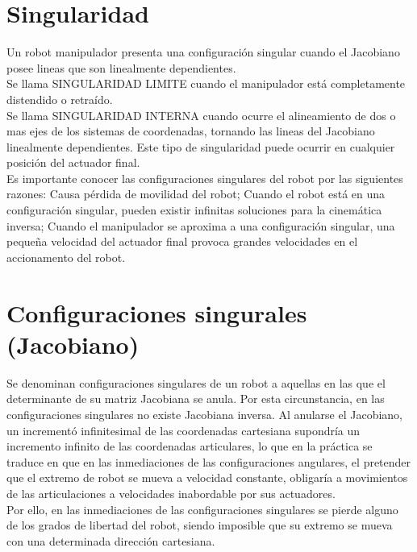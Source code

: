 \documentclass[11pt,a4paper,oldfontcommands,oneside]{memoir}
\begin{document}
\section{Singularidad}
Un robot manipulador presenta una configuración singular cuando el Jacobiano posee lineas que son linealmente dependientes. \\
Se llama SINGULARIDAD LIMITE cuando el manipulador está completamente distendido o retraído. \\
Se llama SINGULARIDAD INTERNA cuando ocurre el alineamiento de dos o mas ejes de los sistemas de coordenadas, tornando las lineas del Jacobiano linealmente dependientes. Este tipo de singularidad puede ocurrir en cualquier posición del actuador final. \\
Es importante conocer las configuraciones singulares del robot por las siguientes razones: Causa pérdida de movilidad del robot; Cuando el robot está en una configuración singular, pueden existir infinitas soluciones para la cinemática inversa; Cuando el manipulador se aproxima a una configuración singular, una pequeña velocidad del actuador final provoca grandes velocidades en el accionamento del robot.\\
\section{Configuraciones singurales (Jacobiano)}
Se denominan configuraciones singulares de un robot a aquellas en las que el determinante de su matriz Jacobiana se anula. Por esta circunstancia, en las configuraciones singulares no existe Jacobiana inversa. Al anularse el Jacobiano, un incrementó infinitesimal de las coordenadas cartesiana supondría un incremento infinito de las coordenadas articulares, lo que en la práctica se traduce en que en las inmediaciones de las configuraciones angulares, el pretender que  el extremo de robot se mueva a velocidad constante, obligaría a movimientos de las articulaciones a velocidades inabordable por sus actuadores.\\
Por ello, en las inmediaciones de las configuraciones singulares se pierde alguno de los grados de libertad del robot, siendo imposible que su extremo se mueva con una determinada dirección cartesiana. 
\end{document}
